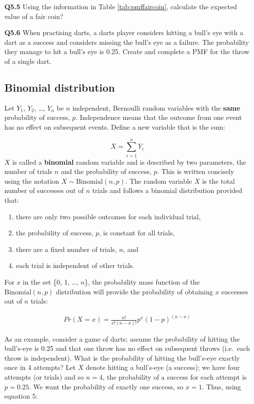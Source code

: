 \documentclass[
  oneside]{krantz}
\providecommand{\tightlist}{%
  \setlength{\itemsep}{0pt}\setlength{\parskip}{0pt}}
\begin{document}
\textbf{Q5.5} Using the information in Table \ref{tab:pmffaircoin}, calculate the expected value of a fair coin?

\textbf{Q5.6} When practising darts, a darts player considers hitting a bull's eye with a dart as a success and considers missing the bull's eye as a failure. The probability they manage to hit a bull's eye is 0.25. Create and complete a PMF for the throw of a single dart.

\hypertarget{binomial-distribution}{%
\subsection{Binomial distribution}\label{binomial-distribution}}

Let \(Y_1\), \(Y_2\), \ldots, \(Y_n\) be \(n\) independent, Bernoulli random variables with the \textbf{same} probability of success, \(p\). Independence means that the outcome from one event has no effect on subsequent events. Define a new variable that is the sum:

\[X = \sum_{i=1}^n Y_i\]
\(X\) is called a \textbf{binomial} random variable and is described by two parameters, the number of trials \(n\) and the probability of success, \(p\). This is written concisely using the notation \(X \sim \textrm{Binomial}(n, p)\). The random variable \(X\) is the total number of successes out of \(n\) trials and follows a binomial distribution provided that:

\begin{enumerate}
\def\labelenumi{\arabic{enumi}.}
\tightlist
\item
  there are only two possible outcomes for each individual trial,
\item
  the probability of success, \(p\), is constant for all trials,
\item
  there are a fixed number of trials, \(n\), and
\item
  each trial is independent of other trials.
\end{enumerate}

For \(x\) in the set \{0, 1, \ldots, \(n\)\}, the probability mass function of the \(\textrm{Binomial}(n, p)\) distribution will provide the probability of obtaining \(x\) successes out of \(n\) trials:

\begin{align}
Pr(X=x) = \frac{n!}{x!(n-x)!}p^x (1-p)^{(n-x)}
\end{align}

As an example, consider a game of darts; assume the probability of hitting the bull's-eye is 0.25 and that one throw has no effect on subsequent throws (i.e.~each throw is independent). What is the probability of hitting the bull's-eye exactly once in 4 attempts? Let \(X\) denote hitting a bull's-eye (a success); we have four attempts (or trials) and so \(n=4\), the probability of a success for each attempt is \(p=0.25\). We want the probability of exactly one success, so \(x=1\). Thus, using equation 5:
\end{document}

